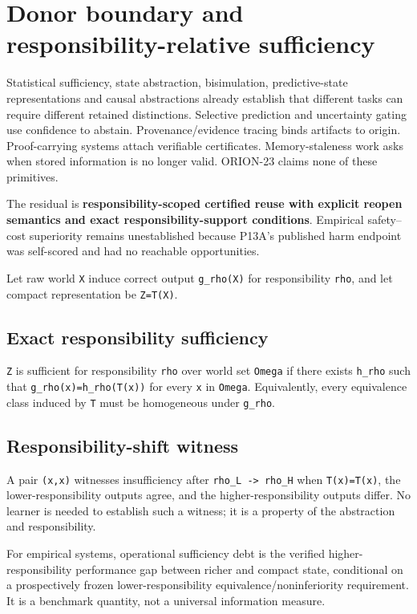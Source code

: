 \section{Donor boundary and responsibility-relative
sufficiency}\label{donor-boundary-and-responsibility-relative-sufficiency}

Statistical sufficiency, state abstraction, bisimulation,
predictive-state representations and causal abstractions already
establish that different tasks can require different retained
distinctions. Selective prediction and uncertainty gating use confidence
to abstain. Provenance/evidence tracing binds artifacts to origin.
Proof-carrying systems attach verifiable certificates. Memory-staleness
work asks when stored information is no longer valid. ORION-23 claims
none of these primitives.

The residual is \textbf{responsibility-scoped certified reuse with
explicit reopen semantics and exact responsibility-support conditions}.
Empirical safety--cost superiority remains unestablished because P13A's
published harm endpoint was self-scored and had no reachable
opportunities.

Let raw world \texttt{X} induce correct output \texttt{g\_rho(X)} for
responsibility \texttt{rho}, and let compact representation be
\texttt{Z=T(X)}.

\subsection{Exact responsibility
sufficiency}\label{exact-responsibility-sufficiency}

\texttt{Z} is sufficient for responsibility \texttt{rho} over world set
\texttt{Omega} if there exists \texttt{h\_rho} such that
\texttt{g\_rho(x)=h\_rho(T(x))} for every \texttt{x} in \texttt{Omega}.
Equivalently, every equivalence class induced by \texttt{T} must be
homogeneous under \texttt{g\_rho}.

\subsection{Responsibility-shift
witness}\label{responsibility-shift-witness}

A pair \texttt{(x,x\textquotesingle{})} witnesses insufficiency after
\texttt{rho\_L\ -\textgreater{}\ rho\_H} when
\texttt{T(x)=T(x\textquotesingle{})}, the lower-responsibility outputs
agree, and the higher-responsibility outputs differ. No learner is
needed to establish such a witness; it is a property of the abstraction
and responsibility.

For empirical systems, operational sufficiency debt is the verified
higher-responsibility performance gap between richer and compact state,
conditional on a prospectively frozen lower-responsibility
equivalence/noninferiority requirement. It is a benchmark quantity, not
a universal information measure.
